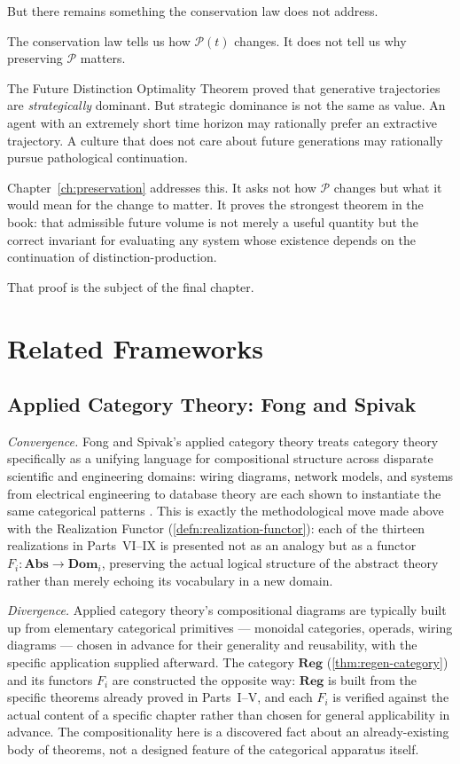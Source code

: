 \documentclass[12pt,twoside,openright]{book}
\begin{document}
But there remains something the conservation law
does not address.

The conservation law tells us how $\mathcal{P}(t)$
changes. It does not tell us why preserving
$\mathcal{P}$ matters.

The Future Distinction Optimality Theorem proved that
generative trajectories are \emph{strategically}
dominant. But strategic dominance is not the same
as value. An agent with an extremely short time horizon
may rationally prefer an extractive trajectory.
A culture that does not care about future generations
may rationally pursue pathological continuation.

Chapter~\ref{ch:preservation} addresses this.
It asks not how $\mathcal{P}$ changes but what it
would mean for the change to matter. It proves the
strongest theorem in the book: that admissible
future volume is not merely a useful quantity but
the correct invariant for evaluating any system
whose existence depends on the continuation of
distinction-production.

That proof is the subject of the final chapter.

\section{Related Frameworks}
\label{sec:ch30-related-frameworks}

\subsection*{Applied Category Theory: Fong and Spivak}

\emph{Convergence.} Fong and Spivak's applied category theory
treats category theory specifically as a unifying language for
compositional structure across disparate scientific and
engineering domains: wiring diagrams, network models, and systems
from electrical engineering to database theory are each shown to
instantiate the same categorical patterns \parencite{fong2019}.
This is exactly the methodological move made above with the
Realization Functor (\cref{defn:realization-functor}): each of
the thirteen realizations in Parts~VI--IX is presented not as an
analogy but as a functor $F_i:\mathbf{Abs}\to\mathbf{Dom}_i$,
preserving the actual logical structure of the abstract theory
rather than merely echoing its vocabulary in a new domain.

\emph{Divergence.} Applied category theory's compositional
diagrams are typically built up from elementary categorical
primitives --- monoidal categories, operads, wiring diagrams ---
chosen in advance for their generality and reusability, with the
specific application supplied afterward. The category
$\mathbf{Reg}$ (\cref{thm:regen-category}) and its functors $F_i$
are constructed the opposite way: $\mathbf{Reg}$ is built from the
specific theorems already proved in Parts~I--V, and each $F_i$ is
verified against the actual content of a specific chapter rather
than chosen for general applicability in advance. The
compositionality here is a discovered fact about an
already-existing body of theorems, not a designed feature of the
categorical apparatus itself.
\end{document}
